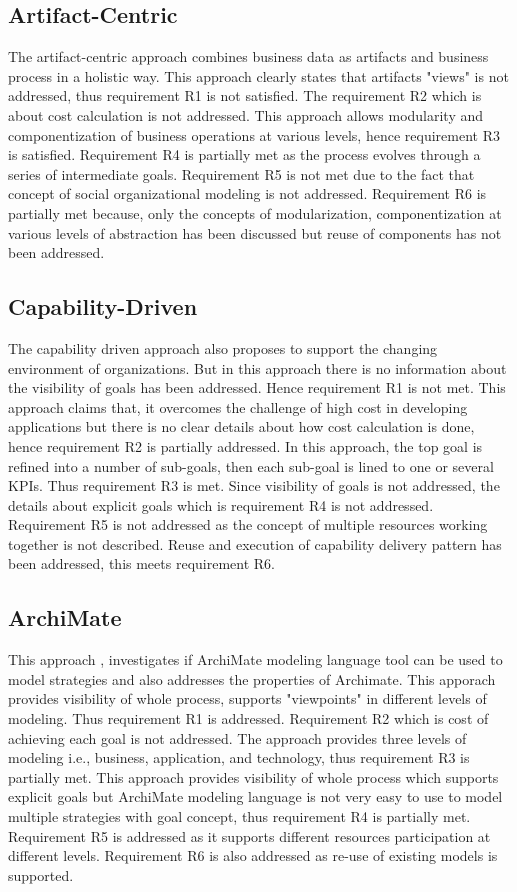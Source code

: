 \subsection{Artifact-Centric} 
The artifact-centric approach \cite{Cohn2009} combines business data as artifacts and business process in a holistic way. This approach clearly states that artifacts "views" is not addressed, thus requirement R1 is not satisfied. The requirement R2 which is about cost calculation is not addressed. This approach allows modularity and componentization of business operations at various levels, hence requirement R3 is satisfied. Requirement R4  is partially met as the process evolves through a series of intermediate goals. Requirement R5 is not met due to the fact that concept of social organizational modeling is not addressed. Requirement R6 is partially met because, only the concepts of modularization, componentization at various levels of abstraction has been discussed but reuse of components has not been addressed.

\subsection{Capability-Driven} 
The capability driven approach \cite{Stirna2012} also proposes to support the changing environment of organizations. But in this approach there is no information about the visibility of goals has been addressed. Hence requirement R1 is not met. This approach claims that, it overcomes the challenge of high cost in developing applications but there is no clear details about how cost calculation is done, hence requirement R2 is partially addressed. In this approach, the top goal is refined into a number of sub-goals, then each sub-goal is lined to one or several KPIs. Thus requirement R3 is met. Since visibility of goals is not addressed, the details about explicit goals which is requirement R4 is not addressed. Requirement R5 is not addressed as the concept of multiple resources working together is not described. Reuse and execution of capability delivery pattern has been addressed, this meets requirement R6. 

\subsection{ArchiMate} 
This approach \cite{Aldea2015}, investigates if ArchiMate modeling language tool can be used to model strategies and also addresses the properties of Archimate. This apporach provides visibility of whole process, supports "viewpoints" in different levels of modeling. Thus requirement R1 is addressed. Requirement R2 which is cost of achieving each goal is not addressed. The approach provides three levels of modeling i.e., business, application, and technology, thus requirement R3 is partially met. This approach provides visibility of whole process which supports explicit goals but ArchiMate modeling language is not very easy to use to model multiple strategies with goal concept, thus requirement R4 is partially met. Requirement R5 is addressed as it supports different resources participation at different levels. Requirement R6 is also addressed as re-use of existing models is supported. 

